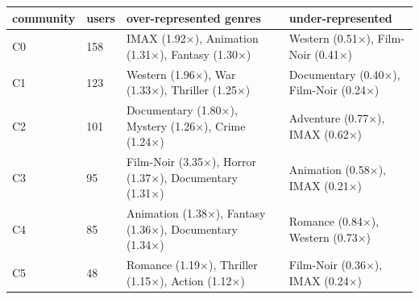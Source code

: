 \begin{tabular}{llp{5cm}p{4cm}}
\toprule
community & users & over-represented genres & under-represented \\
\midrule
C0 & 158 & IMAX (1.92×), Animation (1.31×), Fantasy (1.30×) & Western (0.51×), Film-Noir (0.41×) \\
C1 & 123 & Western (1.96×), War (1.33×), Thriller (1.25×) & Documentary (0.40×), Film-Noir (0.24×) \\
C2 & 101 & Documentary (1.80×), Mystery (1.26×), Crime (1.24×) & Adventure (0.77×), IMAX (0.62×) \\
C3 & 95 & Film-Noir (3.35×), Horror (1.37×), Documentary (1.31×) & Animation (0.58×), IMAX (0.21×) \\
C4 & 85 & Animation (1.38×), Fantasy (1.36×), Documentary (1.34×) & Romance (0.84×), Western (0.73×) \\
C5 & 48 & Romance (1.19×), Thriller (1.15×), Action (1.12×) & Film-Noir (0.36×), IMAX (0.24×) \\
\bottomrule
\end{tabular}
